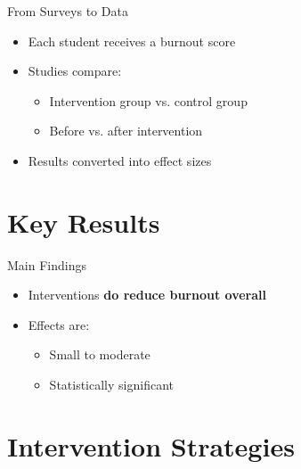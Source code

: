 \documentclass[dvipsnames]{beamer}
\begin{document}

\begin{frame}{From Surveys to Data}
\begin{itemize}
    \item Each student receives a burnout score
    \item Studies compare:
    \begin{itemize}
        \item Intervention group vs. control group
        \item Before vs. after intervention
    \end{itemize}
\end{itemize}



\begin{itemize}
    \item Results converted into effect sizes
\end{itemize}




\end{frame}
\section{Key Results}

\begin{frame}{Main Findings}
\begin{itemize}
    \item Interventions \textbf{do reduce burnout overall}
    \item Effects are:
    \begin{itemize}
        \item Small to moderate
        \item Statistically significant
    \end{itemize}
\end{itemize}





\end{frame}
\section{Intervention Strategies}
\end{document}

